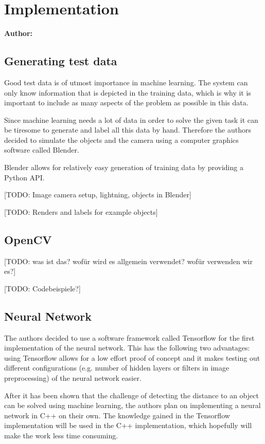 \chapter{Implementation}

\textbf{Author: } 

\section{Generating test data}
Good test data is of utmost importance in machine learning. The system can only know information that is depicted in the training data, which is why it is important to include as many aspects of the problem as possible in this data.

Since machine learning needs a lot of data in order to solve the given task it can be tiresome to generate and label all this data by hand. Therefore the authors decided to simulate the objects and the camera using a computer graphics software called Blender.

Blender allows for relatively easy generation of training data by providing a Python API.

[TODO: Image camera setup, lightning, objects in Blender]

[TODO: Renders and labels for example objects]

\section{OpenCV}

[TODO: was ist das? wofür wird es allgemein verwendet? wofür verwenden wir es?]

[TODO: Codebeispiele?]

\section{Neural Network}
The authors decided to use a software framework called Tensorflow for the first implementation of the neural network. This has the following two advantages: using Tensorflow allows for a low effort proof of concept and it makes testing out different configurations (e.g. number of hidden layers or filters in image preprocessing) of the neural network easier.

After it has been shown that the challenge of detecting the distance to an object can be solved using machine learning, the authors plan on implementing a neural network in C++ on their own. The knowledge gained in the Tensorflow implementation will be used in the C++ implementation, which hopefully will make the work less time consuming.

